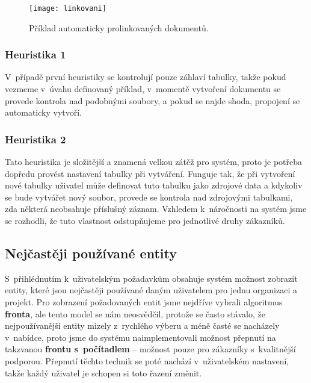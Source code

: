 \begin{figure}[htp]
\centering
\texttt{[image: linkovani]}
\caption{Příklad automaticky prolinkovaných dokumentů.}
\label{linkovani}
\end{figure}

\subsubsection{Heuristika 1}
\par V~případě první heuristiky se kontrolují pouze záhlaví tabulky, takže pokud vezmeme v~úvahu definovaný příklad, v~momentě vytvoření dokumentu se provede kontrola nad podobnými soubory, a pokud se najde shoda, propojení se automaticky vytvoří.
\subsubsection{Heuristika 2}
\par Tato heuristika je složitější a znamená velkou zátěž pro systém, proto je potřeba dopředu provést nastavení tabulky při vytváření. Funguje tak, že při vytvoření nové tabulky uživatel může definovat tuto tabulku jako zdrojové data a kdykoliv se bude vytvářet nový soubor, provede se kontrola nad zdrojovými tabulkami, zda některá neobsahuje příslušný záznam. Vzhledem k~náročnosti na systém jsme se rozhodli, že tuto vlastnost odstupňujeme pro jednotlivé druhy zákazníků.

\subsection{Nejčastěji používané entity}
\par S~přihlédnutím k~uživatelským požadavkům obsahuje systém možnost zobrazit entity, které jsou nejčastěji používané daným uživatelem pro jednu organizaci a projekt. Pro zobrazení požadovaných entit jsme nejdříve vybrali algoritmus \textbf{fronta}, ale tento model se nám neosvědčil, protože se často stávalo, že nejpoužívanější entity mizely z~rychlého výberu a méně časté se nacházely v~nabídce, proto jsme do systému naimplementovali možnost přepnutí na takzvanou \textbf{frontu s~počítadlem} -- možnost pouze pro zákazníky s~kvalitnější podporou. Přepnutí těchto technik se poté nachází v~uživatelském nastavení, takže každý uživatel je schopen si toto řazení změnit.

